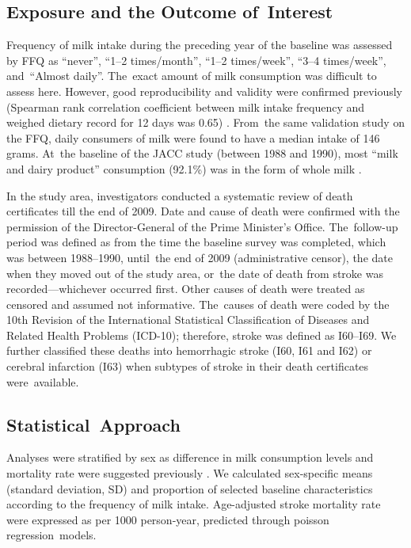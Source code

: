 \documentclass[nutrients,article,accept,moreauthors,pdftex]{Definitions/mdpi}
\begin{document}
\hypertarget{exposure-and-the-outcome-of-interest}{%
\subsection{Exposure and the Outcome of~Interest}\label{exposure-and-the-outcome-of-interest}}

Frequency of milk intake during the preceding year of the baseline was
assessed by FFQ as ``never'', ``1--2 times/month'', ``1--2 times/week'',
``3--4 times/week'', and~``Almost daily''. The~exact amount of milk
consumption was difficult to assess here. However, good reproducibility
and validity were confirmed previously (Spearman rank correlation
coefficient between milk intake frequency and weighed dietary record for
12 days was 0.65) \citep{Date2005}. From~the same validation study
\citep{Date2005} on the FFQ, daily consumers of milk were found to have a
median intake of 146 grams. At~the baseline of the JACC study
(between 1988 and 1990), most ``milk and dairy product'' consumption
(92.1\%) was in the form of whole milk \citep{eigyogenjyo}.

In the study area, investigators conducted a systematic review of death
certificates till the end of 2009. Date and cause of death were
confirmed with the permission of the Director-General of the Prime
Minister's Office. The~follow-up period was defined as from the time
the baseline survey was completed, which was between 1988--1990, until~the end of 2009 (administrative censor), the date when they moved out of
the study area, or~the date of death from stroke was recorded---whichever
occurred first. Other causes of death were treated as censored and
assumed not informative. The~causes of death were coded by the 10th
Revision of the International Statistical Classification of Diseases and
Related Health Problems (ICD-10); therefore, stroke was defined as
I60--I69. We further classified these deaths into hemorrhagic stroke
(I60, I61 and I62) or cerebral infarction (I63) when subtypes of stroke
in their death certificates were~available.

\hypertarget{statistical-approach}{%
\subsection{Statistical~Approach}\label{statistical-approach}}

Analyses were stratified by sex as difference in milk consumption levels
and mortality rate were suggested previously
\citep{wang_milk_2015, Talaei_2016}. We calculated sex-specific means
(standard deviation, SD) and proportion of selected baseline
characteristics according to the frequency of milk intake. Age-adjusted
stroke mortality rate were expressed as per 1000 person-year,
 predicted
through poisson regression~models.
\end{document}

